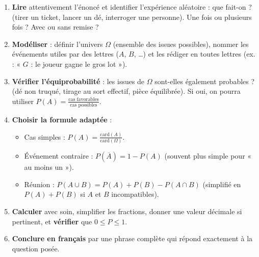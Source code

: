 \documentclass[11pt]{article}
\begin{document}
\begin{methode}
\begin{enumerate}
\item \textbf{Lire} attentivement l'énoncé et identifier l'expérience aléatoire : que fait-on ? (tirer un ticket, lancer un dé, interroger une personne). Une fois ou plusieurs fois ? Avec ou sans remise ?
\item \textbf{Modéliser} : définir l'univers $\Omega$ (ensemble des issues possibles), nommer les événements utiles par des lettres ($A$, $B$, \dots) et les rédiger en toutes lettres (ex. : « $G$ : le joueur gagne le gros lot »).
\item \textbf{Vérifier l'équiprobabilité} : les issues de $\Omega$ sont-elles également probables ? (dé non truqué, tirage au sort effectif, pièce équilibrée). Si oui, on pourra utiliser $P(A) = \frac{\text{cas favorables}}{\text{cas possibles}}$.
\item \textbf{Choisir la formule adaptée} :
      \begin{itemize}
      \item Cas simples : $P(A) = \frac{\text{card}(A)}{\text{card}(\Omega)}$.
      \item Événement contraire : $P(\overline{A}) = 1 - P(A)$ (souvent plus simple pour « au moins un »).
      \item Réunion : $P(A \cup B) = P(A) + P(B) - P(A \cap B)$ (simplifié en $P(A)+P(B)$ si $A$ et $B$ incompatibles).
      \end{itemize}
\item \textbf{Calculer} avec soin, simplifier les fractions, donner une valeur décimale si pertinent, et \textbf{vérifier} que $0 \le P \le 1$.
\item \textbf{Conclure en français} par une phrase complète qui répond exactement à la question posée.
\end{enumerate}
\end{methode}
\end{document}

